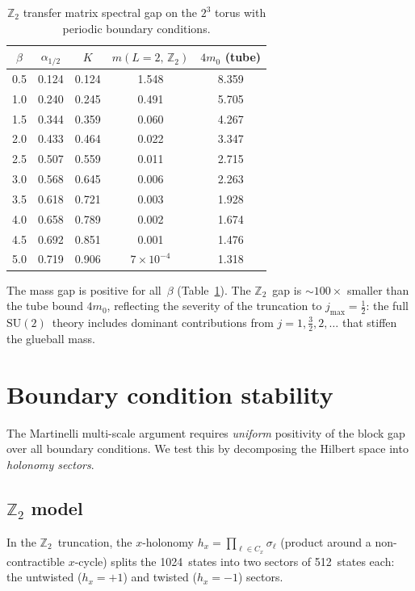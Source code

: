 \documentclass[12pt,a4paper]{article}
\newcommand{\Z}{\mathbb{Z}}
\newcommand{\half}{\tfrac{1}{2}}
\begin{document}
\begin{table}[h]
\centering
\caption{$\Z_2$ transfer matrix spectral gap on the $2^3$ torus with periodic boundary conditions.}
\label{tab:gap}
\begin{tabular}{@{}ccccc@{}}
\toprule
$\beta$ & $\alpha_{1/2}$ & $K$ & $m(L{=}2,\,\Z_2)$ & $4m_0$ (tube) \\
\midrule
0.5 & 0.124 & 0.124 & 1.548 & 8.359 \\
1.0 & 0.240 & 0.245 & 0.491 & 5.705 \\
1.5 & 0.344 & 0.359 & 0.060 & 4.267 \\
2.0 & 0.433 & 0.464 & 0.022 & 3.347 \\
2.5 & 0.507 & 0.559 & 0.011 & 2.715 \\
3.0 & 0.568 & 0.645 & 0.006 & 2.263 \\
3.5 & 0.618 & 0.721 & 0.003 & 1.928 \\
4.0 & 0.658 & 0.789 & 0.002 & 1.674 \\
4.5 & 0.692 & 0.851 & 0.001 & 1.476 \\
5.0 & 0.719 & 0.906 & $7\times 10^{-4}$ & 1.318 \\
\bottomrule
\end{tabular}
\end{table}

The mass gap is positive for all~$\beta$ (Table~\ref{tab:gap}). The $\Z_2$~gap is $\sim 100\times$ smaller than the tube bound $4m_0$, reflecting the severity of the truncation to $j_{\max}=\half$: the full $\mathrm{SU}(2)$~theory includes dominant contributions from $j=1,\frac{3}{2},2,\ldots$ that stiffen the glueball mass.

\section{Boundary condition stability}\label{sec:BC}

The Martinelli multi-scale argument requires \emph{uniform} positivity of the block gap over all boundary conditions. We test this by decomposing the Hilbert space into \emph{holonomy sectors}. 

\subsection{$\Z_2$ model}

In the $\Z_2$~truncation, the $x$-holonomy $h_x=\prod_{\ell\in C_x}\sigma_\ell$ (product around a non-contractible $x$-cycle) splits the 1024~states into two sectors of 512~states each: the untwisted ($h_x=+1$) and twisted ($h_x=-1$) sectors.
\end{document}
